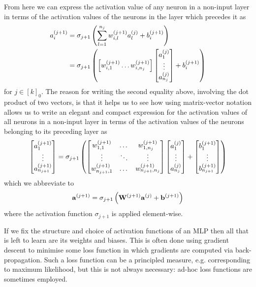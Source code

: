 \documentclass[11pt]{article}
\begin{document}
\noindent From here we can express the activation value of any neuron in a non-input layer in terms of the activation values of the neurons in the layer which precedes it as
\begin{align*}
    a_i^{(j+1)}
    &=
    \sigma_{j+1}\left(
    \sum_{l=1}^{n_j} w_{i,l}^{(j+1)}a_l^{(j)} + b_i^{(j+1)}
    \right)\\
    &=
    \sigma_{j+1}\left(
    \left[w_{i,1}^{(j+1)} \dots w_{i,n_j}^{(j+1)}\right]
    \begin{bmatrix}
        a_1^{(j)}\\
        \vdots\\
        a_{n_j}^{(j)}
    \end{bmatrix}
    +
    b_i^{(j+1)}
\right)
\end{align*}
for $j\in[k]_0$. The reason for writing the second equality above, involving the dot product of two vectors, is that it helps us to see how using matrix-vector notation allows us to write an elegant and compact expression for the activation values of all neurons in a non-input layer in terms of the activation values of the neurons belonging to its preceding layer as
$$
\begin{bmatrix}
    a_1^{(j+1)}\\
    \vdots\\
    a_{n_{j+1}}^{(j+1)}
\end{bmatrix}
=
\sigma_{j+1}\left(
\begin{bmatrix}
    w_{1,1}^{(j+1)} & \dots & w_{1,n_j}^{(j+1)}\\
    \vdots & \ddots & \vdots\\
    w_{n_{j+1},1}^{(j+1)} & \dots & w_{n_{j+1},n_j}^{(j+1)}
\end{bmatrix}
\begin{bmatrix}
    a_1^{(j)}\\
    \vdots\\
    a_{n_j}^{(j)}
\end{bmatrix}
+
\begin{bmatrix}
    b_1^{(j+1)}\\
    \vdots\\
    b_{n_{j+1}}^{(j+1)}
\end{bmatrix}
\right)
$$
which we abbreviate to
$$
\mathbf{a}^{(j+1)}=\sigma_{j+1}\left(\mathbf{W}^{(j+1)}\mathbf{a}^{(j)}+\mathbf{b}^{(j+1)}\right)
$$
where the activation function $\sigma_{j+1}$ is applied element-wise.

If we fix the structure and choice of activation functions of an MLP then all that is left to learn are its weights and biases. This is often done using gradient descent to minimise some loss function in which gradients are computed via back-propagation. Such a loss function can be a principled measure, e.g. corresponding to maximum likelihood, but this is not always necessary: ad-hoc loss functions are sometimes employed.
\end{document}
